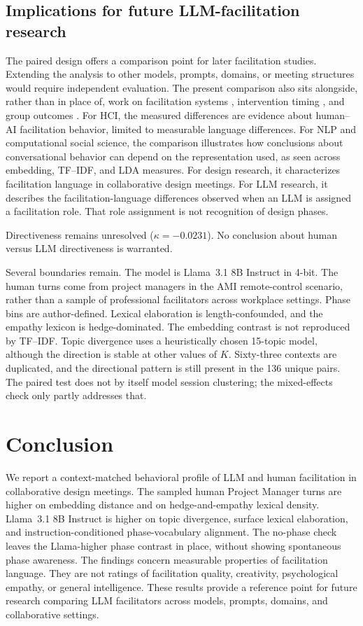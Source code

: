 \documentclass[11pt]{article}
\begin{document}
\subsection{Implications for future LLM-facilitation research}
The paired design offers a comparison point for later facilitation studies. Extending the analysis to other models, prompts, domains, or meeting structures would require independent evaluation. The present comparison also sits alongside, rather than in place of, work on facilitation systems \citep{dong2024facilitation}, intervention timing \citep{tsirmpas2026facilitate}, and group outcomes \citep{alsobay2026table}. For HCI, the measured differences are evidence about human--AI facilitation behavior, limited to measurable language differences. For NLP and computational social science, the comparison illustrates how conclusions about conversational behavior can depend on the representation used, as seen across embedding, TF--IDF, and LDA measures. For design research, it characterizes facilitation language in collaborative design meetings. For LLM research, it describes the facilitation-language differences observed when an LLM is assigned a facilitation role. That role assignment is not recognition of design phases.

Directiveness remains unresolved ($\kappa = -0.0231$). No conclusion about human versus LLM directiveness is warranted.

Several boundaries remain. The model is Llama~3.1 8B Instruct in 4-bit. The human turns come from project managers in the AMI remote-control scenario, rather than a sample of professional facilitators across workplace settings. Phase bins are author-defined. Lexical elaboration is length-confounded, and the empathy lexicon is hedge-dominated. The embedding contrast is not reproduced by TF--IDF. Topic divergence uses a heuristically chosen 15-topic model, although the direction is stable at other values of $K$. Sixty-three contexts are duplicated, and the directional pattern is still present in the 136 unique pairs. The paired test does not by itself model session clustering; the mixed-effects check only partly addresses that.

\section{Conclusion}
We report a context-matched behavioral profile of LLM and human facilitation in collaborative design meetings. The sampled human Project Manager turns are higher on embedding distance and on hedge-and-empathy lexical density. Llama~3.1 8B Instruct is higher on topic divergence, surface lexical elaboration, and instruction-conditioned phase-vocabulary alignment. The no-phase check leaves the Llama-higher phase contrast in place, without showing spontaneous phase awareness. The findings concern measurable properties of facilitation language. They are not ratings of facilitation quality, creativity, psychological empathy, or general intelligence. These results provide a reference point for future research comparing LLM facilitators across models, prompts, domains, and collaborative settings.
\end{document}
